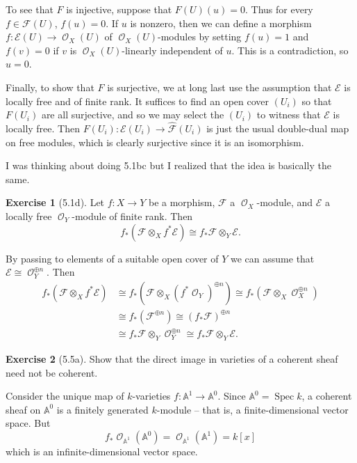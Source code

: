 \documentclass[10pt]{article}
\newcommand{\Aff}{\mathbb A}
\newcommand{\Spec}{\operatorname{Spec}}
\DeclareMathOperator{\Olo}{\mathscr O}
\theoremstyle{definition}
\newtheorem{exer}{Exercise}
\begin{document}
To see that $F$ is injective, suppose that $F(U)(u) = 0$.
Thus for every $f \in \mathscr F(U)$, $f(u) = 0$.
If $u$ is nonzero, then we can define a morphism $f: \mathscr E(U) \to \Olo_X(U)$ of $\Olo_X(U)$-modules by setting $f(u) = 1$ and $f(v) = 0$ if $v$ is $\Olo_X(U)$-linearly independent of $u$.
This is a contradiction, so $u = 0$.

Finally, to show that $F$ is surjective, we at long last use the assumption that $\mathscr E$ is locally free and of finite rank.
It suffices to find an open cover $(U_i)$ so that $F(U_i)$ are all surjective, and so we may select the $(U_i)$ to witness that $\mathscr E$ is locally free.
Then $F(U_i): \mathscr E(U_i) \to \widehat{\mathscr F}(U_i)$ is just the usual double-dual map on free modules, which is clearly surjective since it is an isomorphism.

I was thinking about doing 5.1bc but I realized that the idea is basically the same.

\begin{exer}[5.1d]
Let $f: X \to Y$ be a morphism, $\mathscr F$ a $\Olo_X$-module, and $\mathscr E$ a locally free $\Olo_Y$-module of finite rank.
Then
$$f_*(\mathscr F \otimes_X f^* \mathscr E) \cong f_* \mathscr F \otimes_Y \mathscr E.$$
\end{exer}

By passing to elements of a suitable open cover of $Y$ we can assume that $\mathscr E \cong \Olo_Y^{\oplus n}$.
Then
\begin{align*}
f_*(\mathscr F \otimes_X f^* \mathscr E) &\cong f_*(\mathscr F \otimes_X (f^* \Olo_Y)^{\oplus n}) \cong f_* (\mathscr F \otimes_X \Olo_X^{\oplus n}) \\
&\cong f_* (\mathscr F^{\oplus n}) \cong (f_* \mathscr F)^{\oplus n} \\
&\cong f_* \mathscr F \otimes_Y \Olo_Y^{\oplus n} \cong f_* \mathscr F \otimes_Y \mathscr E.
\end{align*}

\begin{exer}[5.5a]
Show that the direct image in varieties of a coherent sheaf need not be coherent.
\end{exer}

Consider the unique map of $k$-varieties $f: \Aff^1 \to \Aff^0$.
Since $\Aff^0 = \Spec k$, a coherent sheaf on $\Aff^0$ is a finitely generated $k$-module -- that is, a finite-dimensional vector space.
But
$$f_* \Olo_{\Aff^1}(\Aff^0) = \Olo_{\Aff^1}(\Aff^1) = k[x]$$
which is an infinite-dimensional vector space.
\end{document}
